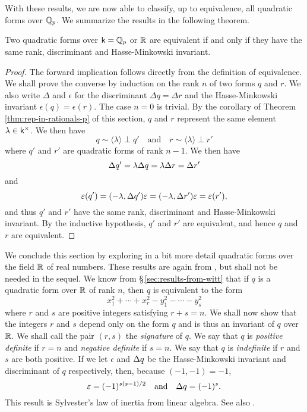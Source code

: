 With these results, we are now able to classify, up to equivalence, all quadratic forms over \(\mathbb{Q}_p\). We summarize the results in the following theorem.

\begin{theoremx}{\normalfont\cite[p.~39]{serre2012course}}
    Two quadratic forms over \(\mathsf{k} = \mathbb{Q}_p\) or \(\mathbb{R}\) are equivalent if and only if they have the same rank, discriminant and Hasse-Minkowski invariant.
\end{theoremx}

\begin{proof}
    The forward implication follows directly from the definition of equivalence. We shall prove the converse by induction on the rank \(n\) of two  forms \(q\) and \(r\). We also write \(\Delta\) and \(\epsilon\) for the discriminant \(\Delta q = \Delta r\) and the Hasse-Minkowski invariant \(\epsilon(q) = \epsilon(r)\). The case \(n = 0\) is trivial. By the corollary of Theorem\,\ref{thm:rep-in-rationals-p} of this section, \(q\) and \(r\) represent the same element \(\lambda \in \mathsf{k}^{\times}\). We then have
    \[
        q \sim \langle \lambda \rangle \perp q' \quad \text{and} \quad r \sim \langle \lambda \rangle \perp r'
    \]
    where \(q'\) and \(r'\) are quadratic forms of rank \(n - 1\). We then have
    \[
      {\Delta} q' = \lambda {\Delta} q = \lambda {\Delta} r = {\Delta} r'
    \]
    and 
    \[
        \varepsilon(q') = (-\lambda, {\Delta} q')\varepsilon = (-\lambda, {\Delta} r')\varepsilon = \varepsilon(r'),
    \]
    and thus \(q'\) and \(r'\) have the same rank, discriminant and Hasse-Minkowski invariant. By the inductive hypothesis, \(q'\) and \(r'\) are equivalent, and hence \(q\) and \(r\) are equivalent.
\end{proof}

We conclude this section by exploring in a bit more detail quadratic forms over the field \(\mathbb{R}\) of real numbers. These results are again from \cite{serre2012course}, but shall not be needed in the sequel. We know from \S\,\ref{sec:results-from-witt} that if \(q\) is a quadratic form over \(\mathbb{R}\) of rank \(n\), then \(q\) is equivalent to the form
\[
    x_1^2 + \cdots + x_{r}^2 - y_1^2 - \cdots - y_{s}^2
\]
where \(r\) and \(s\) are positive integers satisfying \(r + s = n\). We shall now show that the integers \(r\) and \(s\) depend only on the form \(q\) and is thus an invariant of \(q\) over \(\mathbb{R}\). We shall call the pair \((r,s)\) the \emph{signature} of \(q\). We say that \(q\) is \emph{positive definite} if \(r = n\) and \emph{negative definite} if \(s = n\). We say that \(q\) is \emph{indefinite} if \(r\) and \(s\) are both positive. If we let \(\epsilon\) and \({\Delta} q\) be the Hasse-Minkowski invariant and discriminant of \(q\) respectively, then, because \((-1, -1) = -1\),
\[
    \varepsilon = (-1)^{s(s-1)/2} \quad \text{and} \quad {\Delta} q = (-1)^{s}.
\]
This result is Sylvester's law of inertia from linear algebra. See also \cite[pp.~83--84]{szymiczek2017bilinear}.

